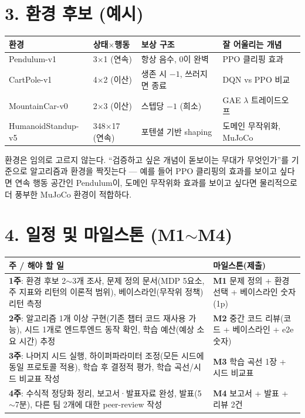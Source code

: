 \documentclass[12pt]{article}
\begin{document}
\section*{3. 환경 후보 (예시)}
\begin{center}
\small
\begin{tabular}{@{}lllp{4.2cm}@{}}
\toprule
환경 & 상태$\times$행동 & 보상 구조 & 잘 어울리는 개념 \\
\midrule
Pendulum-v1 & 3$\times$1 (연속) & 항상 음수, 0이 완벽 & PPO 클리핑 효과 \\
CartPole-v1 & 4$\times$2 (이산) & 생존 시 $-1$, 쓰러지면 종료 & DQN vs PPO 비교 \\
MountainCar-v0 & 2$\times$3 (이산) & 스텝당 $-1$ (희소) & GAE $\lambda$ 트레이드오프 \\
HumanoidStandup-v5 & 348$\times$17 (연속) & 포텐셜 기반 shaping & 도메인 무작위화, MuJoCo \\
\bottomrule
\end{tabular}
\end{center}
\vspace{4pt}
환경은 임의로 고르지 않는다. ``검증하고 싶은 개념이 돋보이는 무대가
무엇인가''를 기준으로 알고리즘과 환경을 짝짓는다 --- 예를 들어 PPO
클리핑의 효과를 보이고 싶다면 연속 행동 공간인 Pendulum이, 도메인
무작위화 효과를 보이고 싶다면 물리적으로 더 풍부한 MuJoCo 환경이
적합하다.

\section*{4. 일정 및 마일스톤 (M1$\sim$M4)}
\begin{center}
\small
\begin{tabular}{@{}p{7.6cm}p{5.2cm}@{}}
\toprule
\textbf{주 / 해야 할 일} & \textbf{마일스톤(제출)} \\
\midrule
\textbf{1주}: 환경 후보 2$\sim$3개 조사, 문제 정의 문서(MDP 5요소, 주
지표와 리턴의 이론적 범위), 베이스라인(무작위 정책) 리턴 측정 &
\textbf{M1} 문제 정의 + 환경 선택 + 베이스라인 숫자 (1p) \\
\textbf{2주}: 알고리즘 1개 이상 구현(기존 챕터 코드 재사용 가능), 시드
1개로 엔드투엔드 동작 확인, 학습 예산(예상 소요 시간) 추정 &
\textbf{M2} 중간 코드 리뷰(코드 + 베이스라인 + e2e 숫자) \\
\textbf{3주}: 나머지 시드 실행, 하이퍼파라미터 조정(모든 시드에 동일
프로토콜 적용), 학습 후 결정적 평가, 학습 곡선/시드 비교표 작성 &
\textbf{M3} 학습 곡선 1장 + 시드 비교표 \\
\textbf{4주}: 수식적 정당화 정리, 보고서·발표자료 완성, 발표(5$\sim$7분),
다른 팀 2개에 대한 peer-review 작성 & \textbf{M4} 보고서 + 발표 +
리뷰 2건 \\
\bottomrule
\end{tabular}
\end{center}
\end{document}
